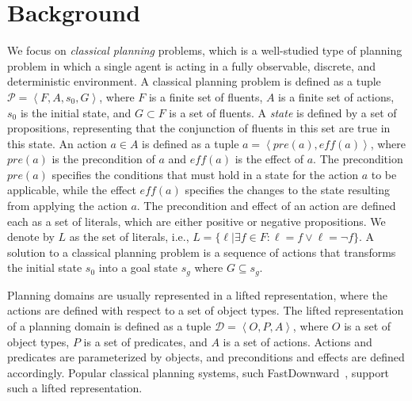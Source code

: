 \documentclass{article}
\theoremstyle{definition}
\theoremstyle{remark}
\newcommand{\tuple}[1]{\ensuremath{\left \langle #1 \right \rangle }}
\newif\ifaddcomments
\newcommand{\roni}[1]{\ifaddcomments{\textcolor{red}{[Roni: #1]}}\fi}
\begin{document}
\section{Background}

We focus on \emph{classical planning} problems, which is a well-studied type of planning problem in which a single agent is acting in a fully observable, discrete, and deterministic environment. 
A classical planning problem is defined as a tuple $\mathcal{P} = \tuple{F, A, s_0, G}$, where $F$ is a finite set of fluents, $A$ is a finite set of actions, $s_0$ is the initial state, and $G\subset F$ is a set of fluents. 
A \emph{state} is defined by a set of propositions, representing that the conjunction of fluents in this set are true in this state.
An action $a\in A$ is defined as a tuple $a = \tuple{\mathit{pre}(a), \mathit{eff}(a)}$, where $\mathit{pre}(a)$ is the precondition of $a$ and $\mathit{eff}(a)$ is the effect of $a$. 
The precondition $\mathit{pre}(a)$ specifies the conditions that must hold in a state for the action $a$ to be applicable, while the effect $\mathit{eff}(a)$ specifies the changes to the state resulting from applying the action $a$.   
The precondition and effect of an action are defined each as a set of literals, which are either positive or negative propositions. We denote by $L$ as the set of literals, i.e., $L=\{\ell | \exists f\in F: \ell=f \vee \ell=\neg f\}$. \roni{Not sure about the }
A solution to a classical planning problem is a sequence of actions that transforms the initial state $s_0$ into a goal state $s_g$ where $G\subseteq s_g$. \roni{Minor modification to goal state to reflect the change above}


Planning domains are usually represented in a lifted representation, where the actions are defined with respect to a set of object types.
The lifted representation of a planning domain is defined as a tuple $\mathcal{D} = \tuple{O, P, A}$, where $O$ is a set of object types, $P$ is a set of predicates, and $A$ is a set of actions. Actions and predicates are parameterized by objects, and preconditions and effects are defined accordingly. 
Popular classical planning systems, such FastDownward~\citep{helmert2006fast}, support such a lifted representation. 
\end{document}
